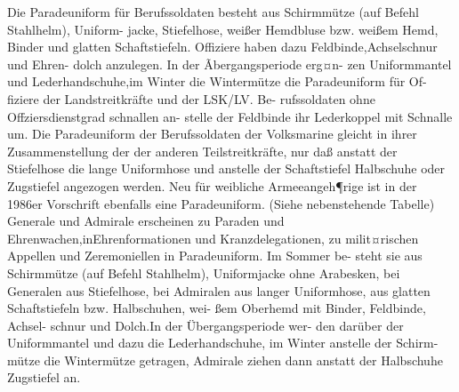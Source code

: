 Die Paradeuniform für Berufssoldaten besteht
aus Schirmmütze (auf Befehl Stahlhelm), Uniform-
jacke, Stiefelhose, weißer Hemdbluse bzw. weißem
Hemd, Binder und glatten Schaftstiefeln. Offiziere
haben dazu Feldbinde,Achselschnur und Ehren-
dolch anzulegen. In der Ãbergangsperiode erg¤n-
zen Uniformmantel und Lederhandschuhe,im
Winter die Wintermütze die Paradeuniform für Of-
fiziere der Landstreitkräfte und der LSK/LV. Be-
rufssoldaten ohne Offziersdienstgrad schnallen an-
stelle der Feldbinde ihr Lederkoppel mit Schnalle
um.
Die Paradeuniform der Berufssoldaten
der
Volksmarine gleicht in ihrer Zusammenstellung der
der anderen Teilstreitkräfte, nur daß anstatt
der
Stiefelhose die lange Uniformhose und anstelle der
Schaftstiefel Halbschuhe oder Zugstiefel angezogen
werden.
Neu für weibliche Armeeangeh¶rige ist in der 1986er Vorschrift ebenfalls eine Paradeuniform.
(Siehe nebenstehende Tabelle)
Generale und Admirale erscheinen zu Paraden
und Ehrenwachen,inEhrenformationen und
Kranzdelegationen, zu milit¤rischen Appellen und
Zeremoniellen in Paradeuniform. Im Sommer be-
steht sie aus Schirmmütze (auf Befehl Stahlhelm),
Uniformjacke ohne Arabesken, bei Generalen aus
Stiefelhose, bei Admiralen aus langer Uniformhose,
aus glatten Schaftstiefeln bzw. Halbschuhen, wei-
ßem Oberhemd mit Binder, Feldbinde, Achsel-
schnur und Dolch.In der Übergangsperiode wer-
den darüber der Uniformmantel und dazu die Lederhandschuhe, im Winter anstelle der Schirm-
mütze die Wintermütze getragen, Admirale ziehen
dann anstatt der Halbschuhe Zugstiefel an.